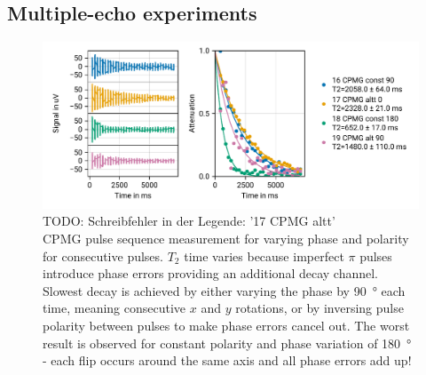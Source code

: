 \documentclass[
    parskip=half, 
    twoside=false,
    twocolumn=true,
    fontsize=11pt,
]{scrarticle}
\begin{document}


\subsection{Multiple-echo experiments}
\begin{figure}
    \centering
    \label{fig:CPMG}
    \includegraphics{figures/05 CPMG.pdf}
    \caption{TODO: Schreibfehler in der Legende: '17 CPMG altt'\\ CPMG pulse sequence measurement for varying phase and polarity for consecutive pulses. $T_2$ time varies because imperfect $\pi$ pulses introduce phase errors providing an additional decay channel. Slowest decay is achieved by either varying the phase by \SI{90}{\degree} each time, meaning consecutive $x$ and $y$ rotations, or by inversing pulse polarity between pulses to make phase errors cancel out. The worst result is observed for constant polarity and phase variation of \SI{180}{\degree} - each flip occurs around the same axis and all phase errors add up!}
\end{figure}
\end{document}
